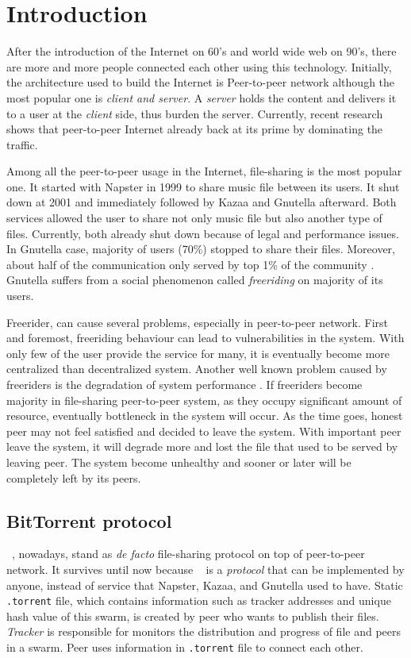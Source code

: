 \chapter{Introduction}
\label{chp:introduction}
After the introduction of the Internet on 60's and world wide web on 90's, there are more and more people connected each other using this technology. Initially, the architecture used to build the Internet is Peer-to-peer network although the most popular one is \textit{client and server}. A \textit{server} holds the content and delivers it to a user at the \textit{client} side, thus burden the server. Currently, recent research shows that peer-to-peer Internet already back at its prime by dominating the traffic\cite{2015:internettraffic:sandvine}.

Among all the peer-to-peer usage in the Internet, file-sharing is the most popular one. It started with Napster in 1999 to share music file between its users. It shut down at 2001 and immediately followed by Kazaa and Gnutella afterward. Both services allowed the user to share not only music file but also another type of files. Currently, both already shut down because of legal and performance issues. In Gnutella case, majority of users (70\%) stopped to share their files. Moreover, about half of the communication only served by top 1\% of the community \cite{2000:freeridegnutella:adar}. Gnutella suffers from a social phenomenon called \textit{freeriding} on majority of its users.

Freerider, can cause several problems, especially in peer-to-peer network. First and foremost, freeriding behaviour can lead to vulnerabilities in the system. With only few of the user provide the service for many, it is eventually become more centralized than decentralized system. Another well known problem caused by freeriders is the degradation of system performance \cite{2000:freeridegnutella:adar}. If freeriders become majority in file-sharing peer-to-peer system, as they occupy significant amount of resource, eventually bottleneck in the system will occur. As the time goes, honest peer may not feel satisfied and decided to leave the system. With important peer leave the system, it will degrade more and lost the file that used to be served by leaving peer. The system become unhealthy and sooner or later will be completely left by its peers.

\section{BitTorrent protocol}
\bt~\cite{2003:bittorrent:cohen}, nowadays, stand as \textit{de facto} file-sharing protocol on top of peer-to-peer network. It survives until now because \bt~ is a \textit{protocol} that can be implemented by anyone, instead of service that Napster, Kazaa, and Gnutella used to have. Static \texttt{.torrent} file, which contains information such as tracker addresses and unique hash value of this swarm, is created by peer who wants to publish their files. \textit{Tracker} is responsible for monitors the distribution and progress of file and peers in a swarm. Peer uses information in \texttt{.torrent} file to connect each other.

